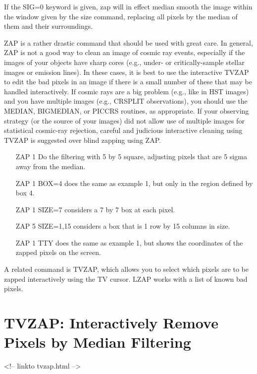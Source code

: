 If the SIG=0 keyword is given, zap will in effect median smooth the image
within the window given by the size command, replacing all pixels by the
median of them and their surroundings.

ZAP is a rather drastic command that should be used with great care.  In
general, ZAP is not a good way to clean an image of cosmic ray events,
especially if the images of your objects have sharp cores (e.g., under- or
critically-sample stellar images or emission lines).  In these cases, it is
best to use the interactive TVZAP to edit the bad pixels in an image if
there is a small number of these that may be handled interactively.  If
cosmic rays are a big problem (e.g., like in HST images) and you have
multiple images (e.g., CRSPLIT observations), you should use the MEDIAN,
BIGMEDIAN, or PICCRS routines, as appropriate.  If your observing strategy
(or the source of your images) did not allow use of multiple images for
statistical cosmic-ray rejection, careful and judicious interactive
cleaning using TVZAP is suggested over blind zapping using ZAP.

\begin{itemize}
  \item[ZAP 1\hfill]{Do the filtering with 5 by 5 square,
       adjusting pixels that are 5 sigma away from the median.}
  \item[ZAP 1 BOX=4\hfill]{does the same as example 1, but only in the
       region defined by box 4.}
  \item[ZAP 1 SIZE=7\hfill]{considers a 7 by 7 box at each pixel.}
  \item[ZAP 5 SIZE=1,15\hfill]{considers a box that is 1 row by 15 columns
       in size.}
  \item[ZAP 1 TTY\hfill]{does the same as example 1, but shows the
       coordinates of the zapped pixels on the screen.}
\end{itemize}

A related command is TVZAP, which allows you to select which pixels are to
be zapped interactively using the TV cursor.  LZAP works with a list of
known bad pixels.

\section{TVZAP: Interactively Remove Pixels by Median Filtering}
\begin{rawhtml}
<!-- linkto tvzap.html -->
\end{rawhtml}

